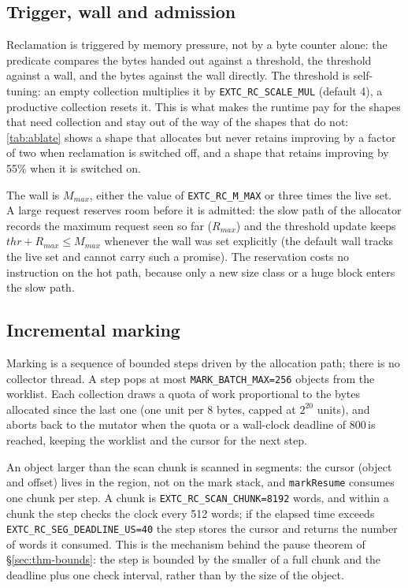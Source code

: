 \subsection{Trigger, wall and admission}
\label{sec:impl-trigger}

Reclamation is triggered by memory pressure, not by a byte counter alone: the predicate compares
the bytes handed out against a threshold, the threshold against a wall, and the bytes against the
wall directly.  The threshold is self-tuning: an empty collection multiplies it by
\texttt{EXTC\_RC\_SCALE\_MUL} (default 4), a productive collection resets it.  This is what makes
the runtime pay for the shapes that need collection and stay out of the way of the shapes that do
not: \tab\ref{tab:ablate} shows a shape that allocates but never retains improving by a factor of
two when reclamation is switched off, and a shape that retains improving by 55\% when it is
switched on.

The wall is $M_{max}$, either the value of \texttt{EXTC\_RC\_M\_MAX} or three times the live
set.  A large request reserves room before it is admitted: the slow path of the allocator records
the maximum request seen so far ($R_{max}$) and the threshold update keeps
$thr + R_{max} \le M_{max}$ whenever the wall was set explicitly (the default wall tracks the
live set and cannot carry such a promise).  The reservation costs no instruction on the hot path,
because only a new size class or a huge block enters the slow path.

\subsection{Incremental marking}
\label{sec:impl-mark}

Marking is a sequence of bounded steps driven by the allocation path; there is no collector
thread.  A step pops at most \texttt{MARK\_BATCH\_MAX=256} objects from the worklist.  Each
collection draws a quota of work proportional to the bytes allocated since the last one (one unit
per 8 bytes, capped at $2^{20}$ units), and aborts back to the mutator when the quota or a
wall-clock deadline of 800\,\us is reached, keeping the worklist and the cursor for the next step.

An object larger than the scan chunk is scanned in segments: the cursor (object and offset) lives
in the region, not on the mark stack, and \texttt{markResume} consumes one chunk per step.  A
chunk is \texttt{EXTC\_RC\_SCAN\_CHUNK=8192} words, and within a chunk the step checks the clock
every 512 words; if the elapsed time exceeds \texttt{EXTC\_RC\_SEG\_DEADLINE\_US=40} the step
stores the cursor and returns the number of words it consumed.  This is the mechanism behind the
pause theorem of \S\ref{sec:thm-bounds}: the step is bounded by the smaller of a full chunk and the
deadline plus one check interval, rather than by the size of the object.


